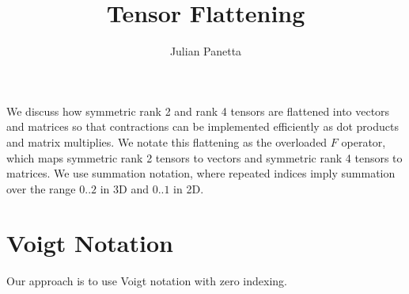 \documentclass[10pt]{article}
\date{}
\title{Tensor Flattening}
\author{Julian Panetta}
\begin{document}
\maketitle

We discuss how symmetric rank 2 and rank 4 tensors are flattened into vectors
and matrices so that contractions can be implemented efficiently as dot products
and matrix multiplies. We notate this flattening as the overloaded $F$ operator,
which maps symmetric rank 2 tensors to vectors and symmetric rank 4 tensors to
matrices. We use summation notation, where repeated indices imply summation
over the range $0..2$ in 3D and $0..1$ in 2D.

\section{Voigt Notation}
Our approach is to use Voigt notation with zero indexing.
\end{document}
